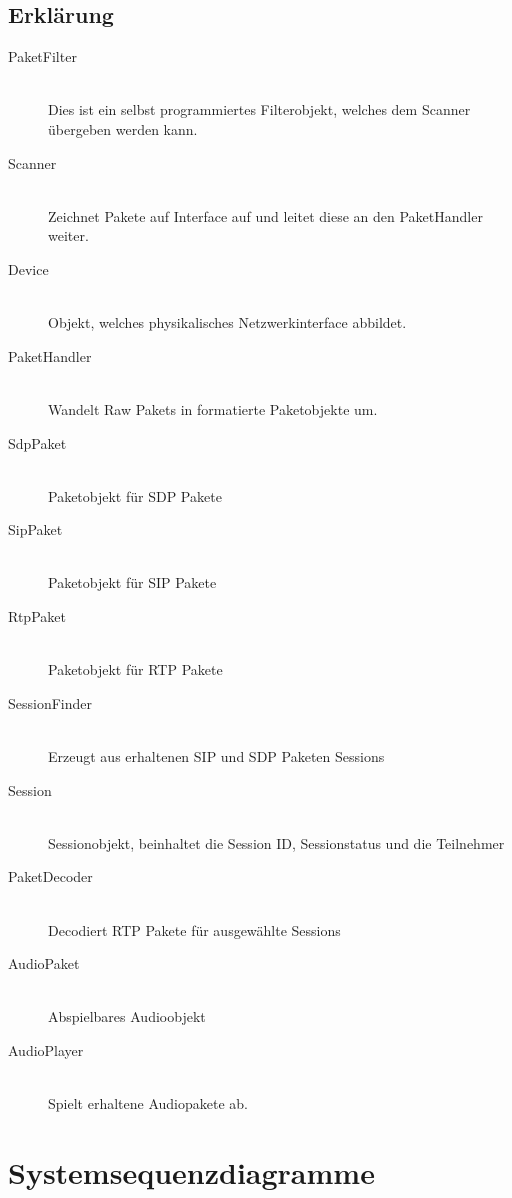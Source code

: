 \documentclass[a4,12pt]{scrartcl}
\begin{document}
\subsection{Erklärung}
\begin{description}
  \item[PaketFilter] \hfill \\
  Dies ist ein selbst programmiertes Filterobjekt, welches dem Scanner übergeben werden kann. 
  \item[Scanner] \hfill \\
  Zeichnet Pakete auf Interface auf und leitet diese an den PaketHandler weiter.
  \item[Device] \hfill \\
  Objekt, welches physikalisches Netzwerkinterface abbildet.
  \item[PaketHandler] \hfill \\
  Wandelt Raw Pakets in formatierte Paketobjekte um.
  \item[SdpPaket] \hfill \\
  Paketobjekt für SDP Pakete
  \item[SipPaket] \hfill \\
  Paketobjekt für SIP Pakete
  \item[RtpPaket] \hfill \\
  Paketobjekt für RTP Pakete
  \item[SessionFinder] \hfill \\
  Erzeugt aus erhaltenen SIP und SDP Paketen Sessions
  \item[Session] \hfill \\
  Sessionobjekt, beinhaltet die Session ID, Sessionstatus und die Teilnehmer
  \item[PaketDecoder] \hfill \\
  Decodiert RTP Pakete für ausgewählte Sessions
  \item[AudioPaket] \hfill \\
  Abspielbares Audioobjekt
  \item[AudioPlayer] \hfill \\
  Spielt erhaltene Audiopakete ab.
\end{description}

\section{Systemsequenzdiagramme}
\end{document}
